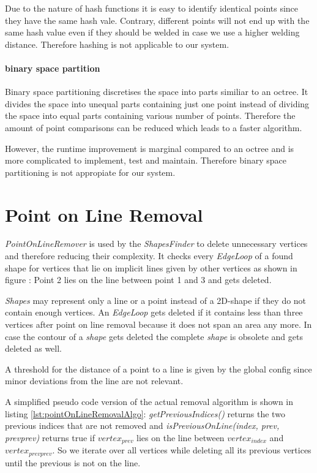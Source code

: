 \documentclass[../ClassicThesis.tex]{subfiles}
\begin{document}
Due to the nature of hash functions it is easy to identify identical points since they have the same hash vale. Contrary, different points will not end up with the same hash value even if they should be welded in case we use a higher welding distance. Therefore hashing is not applicable to our system.

\paragraph{binary space partition}

Binary space partitioning discretises the space into parts similiar to an octree. It divides the space into unequal parts containing just one point instead of dividing the space into equal parts containing various number of points. Therefore the amount of point comparisons can be reduced which leads to a faster algorithm.

However, the runtime improvement is marginal compared to an octree and is more complicated to implement, test and maintain. Therefore binary space partitioning is not appropiate for our system.





\section{Point on Line Removal}

\emph{PointOnLineRemover} is used by the \emph{ShapesFinder} to delete unnecessary vertices and therefore reducing their complexity. It checks every \emph{EdgeLoop} of a found shape for vertices that lie on implicit lines given by other vertices as shown in figure : Point 2 lies on the line between point 1 and 3 and gets deleted.


\emph{Shapes} may represent only a line or a point instead of a 2D-shape if they do not contain enough vertices. An \emph{EdgeLoop} gets deleted if it contains less than three vertices after point on line removal because it does not span an area any more. In case the contour of a \emph{shape} gets deleted the complete \emph{shape} is obsolete and gets deleted as well.

A threshold for the distance of a point to a line is given by the global config since minor deviations from the line are not relevant.

A simplified pseudo code version of the actual removal algorithm is shown in listing \ref{lst:pointOnLineRemovalAlgo}: \emph{getPreviousIndices()} returns the two previous indices that are not removed and \emph{isPreviousOnLine(index, prev, prevprev)} returns true if $ vertex_{prev}$ lies on the line between $vertex_{index}$ and $vertex_{prevprev}$. So we iterate over all vertices while deleting all its previous vertices until the previous is not on the line.
\end{document}
